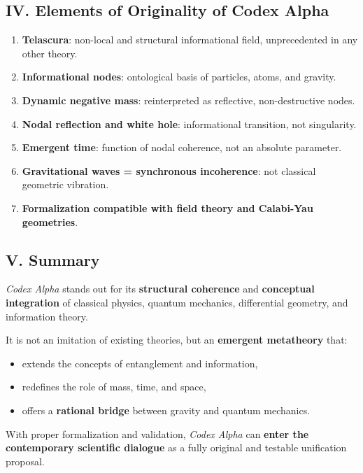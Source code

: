 \documentclass[12pt]{article}
\begin{document}
\subsection*{IV. Elements of Originality of Codex Alpha}
\begin{enumerate}
    \item \textbf{Telascura}: non-local and structural informational field, unprecedented in any other theory.
    \item \textbf{Informational nodes}: ontological basis of particles, atoms, and gravity.
    \item \textbf{Dynamic negative mass}: reinterpreted as reflective, non-destructive nodes.
    \item \textbf{Nodal reflection and white hole}: informational transition, not singularity.
    \item \textbf{Emergent time}: function of nodal coherence, not an absolute parameter.
    \item \textbf{Gravitational waves = synchronous incoherence}: not classical geometric vibration.
    \item \textbf{Formalization compatible with field theory and Calabi-Yau geometries}.
\end{enumerate}

\subsection*{V. Summary}
\textit{Codex Alpha} stands out for its \textbf{structural coherence} and \textbf{conceptual integration} of classical physics, quantum mechanics, differential geometry, and information theory.

It is not an imitation of existing theories, but an \textbf{emergent metatheory} that:
\begin{itemize}
    \item extends the concepts of entanglement and information,
    \item redefines the role of mass, time, and space,
    \item offers a \textbf{rational bridge} between gravity and quantum mechanics.
\end{itemize}

With proper formalization and validation, \textit{Codex Alpha} can \textbf{enter the contemporary scientific dialogue} as a fully original and testable unification proposal.
\end{document}

